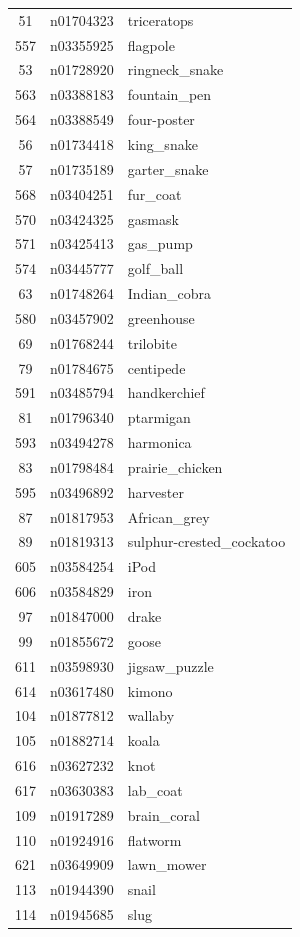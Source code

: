 \begin{table}
\begin{tabular}{cll}
51 & n01704323 & triceratops \\
557 & n03355925 & flagpole \\
53 & n01728920 & ringneck_snake \\
563 & n03388183 & fountain_pen \\
564 & n03388549 & four-poster \\
56 & n01734418 & king_snake \\
57 & n01735189 & garter_snake \\
568 & n03404251 & fur_coat \\
570 & n03424325 & gasmask \\
571 & n03425413 & gas_pump \\
574 & n03445777 & golf_ball \\
63 & n01748264 & Indian_cobra \\
580 & n03457902 & greenhouse \\
69 & n01768244 & trilobite \\
79 & n01784675 & centipede \\
591 & n03485794 & handkerchief \\
81 & n01796340 & ptarmigan \\
593 & n03494278 & harmonica \\
83 & n01798484 & prairie_chicken \\
595 & n03496892 & harvester \\
87 & n01817953 & African_grey \\
89 & n01819313 & sulphur-crested_cockatoo \\
605 & n03584254 & iPod \\
606 & n03584829 & iron \\
97 & n01847000 & drake \\
99 & n01855672 & goose \\
611 & n03598930 & jigsaw_puzzle \\
614 & n03617480 & kimono \\
104 & n01877812 & wallaby \\
105 & n01882714 & koala \\
616 & n03627232 & knot \\
617 & n03630383 & lab_coat \\
109 & n01917289 & brain_coral \\
110 & n01924916 & flatworm \\
621 & n03649909 & lawn_mower \\
113 & n01944390 & snail \\
114 & n01945685 & slug \\

\end{tabular}
\end{table}

